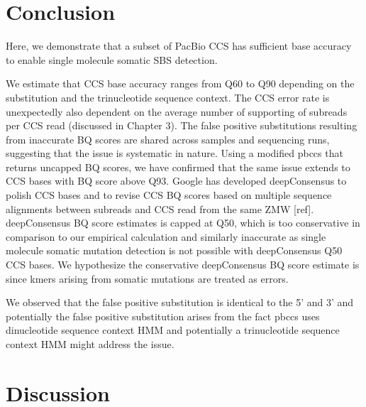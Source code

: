 \section{Conclusion}

Here, we demonstrate that a subset of PacBio CCS has sufficient base accuracy to enable single molecule somatic SBS detection.

We estimate that CCS base accuracy ranges from Q60 to Q90 depending on the substitution and the trinucleotide sequence context. The CCS error rate is unexpectedly also dependent on the average number of supporting of subreads per CCS read (discussed in Chapter 3). The false positive substitutions resulting from inaccurate BQ scores are shared across samples and sequencing runs, suggesting that the issue is systematic in nature. Using a modified pbccs that returns uncapped BQ scores, we have confirmed that the same issue extends to CCS bases with BQ score above Q93. Google has developed deepConsensus to polish CCS bases and to revise CCS BQ scores based on multiple sequence alignments between subreads and CCS read from the same ZMW [ref]. deepConsensus BQ score estimates is capped at Q50, which is too conservative in comparison to our empirical calculation and similarly inaccurate as single molecule somatic mutation detection is not possible with deepConsensus Q50 CCS bases. We hypothesize the conservative deepConsensus BQ score estimate is since kmers arising from somatic mutations are treated as errors. 

We observed that the false positive substitution is identical to the 5’ and 3’ and potentially the false positive substitution arises from the fact pbccs uses dinucleotide sequence context HMM and potentially a trinucleotide sequence context HMM might address the issue. 

\section{Discussion}

